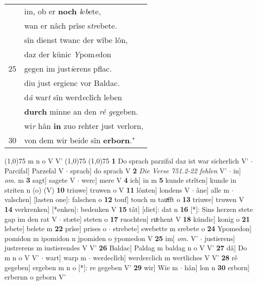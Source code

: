 \documentclass[8pt,a4paper,notitlepage]{article}
\begin{document}
\begin{table}[ht]
\begin{minipage}[t]{0.5\linewidth}
\begin{tabular}{rl}
 & im, ob er \textbf{noch} \textit{l}e\textit{b}ete,\\ 
 & wan er nâch prîse s\textit{tr}ebete.\\ 
 & sîn dienst twanc der wîbe lôn,\\ 
 & daz der künic \textit{Y}pom\textit{e}don\\ 
25 & gegen im just\textit{i}erens pflac.\\ 
 & diu just ergienc vor Baldac.\\ 
 & d\textit{â} war\textit{t} sîn werd\textit{e}clîch leben\\ 
 & \textbf{durch} minne an den \textit{rê ge}geben.\\ 
 & wi\textit{r} hân \textbf{in} zuo rehter just verlorn,\\ 
30 & von dem wir beide sîn \textbf{erborn}."\\ 
\end{tabular}
\scriptsize
\line(1,0){75} \newline
m n o V V' \newline
\line(1,0){75} \newline
\newline
\line(1,0){75} \newline
\textbf{1} Do sprach parzifal daz ist war sicherlich V'  $\cdot$ Parcifal] Parzefal V  $\cdot$ sprach] do sprach V \textbf{2} \textit{Die Verse 751.2-22 fehlen} V'   $\cdot$ in] \textit{om.} m \textbf{3} sagt] sagete V  $\cdot$ werc] mere V \textbf{4} ich] in m \textbf{5} kunde strîten] kunde in striten n (o) (V) \textbf{10} triuwe] truwen o V \textbf{11} lônten] londens V  $\cdot$ âne] alle m  $\cdot$ valschen] [lasten one]: falschen o \textbf{12} touf] touch m tauͯfft o \textbf{13} triuwe] truwen V \textbf{14} verkrenken] [*enken]: bedenken V \textbf{15} tât] [diet]: dat n \textbf{16} [*]: Sins herzen stete gap im den rat V  $\cdot$ stæte] steten o \textbf{17} ruochten] ruͦchent V \textbf{18} kündic] konig o \textbf{21} lebete] belete m \textbf{22} prîse] prises o  $\cdot$ strebete] swebette m srebete o \textbf{24} Ypomedon] pomidon m ipomidon n jpomiden o ẏpomedon V \textbf{25} im] \textit{om.} V'  $\cdot$ justierens] justrerens m iustierendes V V' \textbf{26} Baldac] Paldag m baldag n o V V' \textbf{27} dâ] Do m n o V V'  $\cdot$ wart] warp m  $\cdot$ werdeclîch] werderclich m wertliches V V' \textbf{28} rê gegeben] ergeben m n o [*]: re gegeben V' \textbf{29} wir] Wie m  $\cdot$ hân] lon n \textbf{30} erborn] erbernn o geborn V' \newline
\end{minipage}
\end{table}
\end{document}
